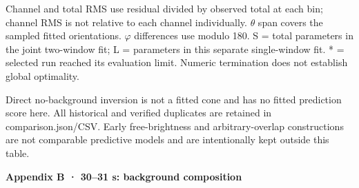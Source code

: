 \documentclass[10pt,a4paper]{article}
\newcommand{\heading}[1]{{\sffamily\Large\bfseries\color{ink}#1}\par\vspace{7pt}}
\begin{document}
Channel and total RMS use residual divided by observed total at each bin; channel RMS is not relative to each channel individually. \(θ\) span covers the sampled fitted orientations. \(φ\) differences use modulo 180\textdegree{}. S = total parameters in the joint two-window fit; L = parameters in this separate single-window fit. * = selected run reached its evaluation limit. Numeric termination does not establish global optimality.\par
Direct no-background inversion is not a fitted cone and has no fitted prediction score here. All historical and verified duplicates are retained in comparison.json/CSV. Early free-brightness and arbitrary-overlap constructions are not comparable predictive models and are intentionally kept outside this table.\par
\clearpage
\heading{Appendix B · 30–31 s: background composition}
\end{document}
